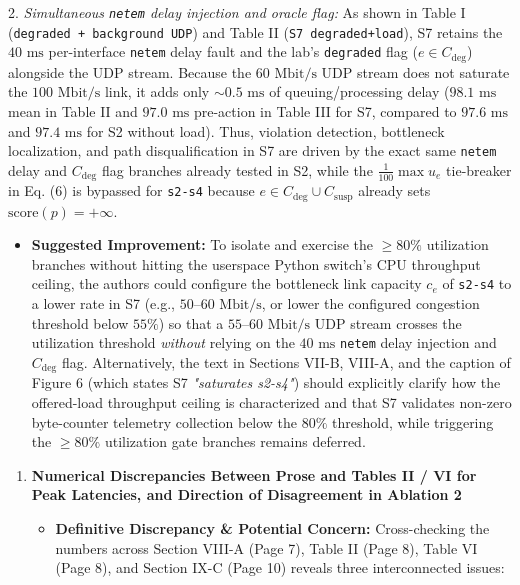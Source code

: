 \documentclass[11pt,a4paper]{article}
\begin{document}
2. \emph{Simultaneous \texttt{netem} delay injection and oracle flag:} As shown in Table I (\texttt{degraded + background UDP}) and Table II (\texttt{S7 degraded+load}), S7 retains the $40\text{ ms}$ per-interface \texttt{netem} delay fault and the lab's \texttt{degraded} flag ($e \in C_{\text{deg}}$) alongside the UDP stream. Because the $60\text{ Mbit/s}$ UDP stream does not saturate the $100\text{ Mbit/s}$ link, it adds only $\sim 0.5\text{ ms}$ of queuing/processing delay ($98.1\text{ ms}$ mean in Table II and $97.0\text{ ms}$ pre-action in Table III for S7, compared to $97.6\text{ ms}$ and $97.4\text{ ms}$ for S2 without load). Thus, violation detection, bottleneck localization, and path disqualification in S7 are driven by the exact same \texttt{netem} delay and $C_{\text{deg}}$ flag branches already tested in S2, while the $\frac{1}{100}\max u_e$ tie-breaker in Eq. (6) is bypassed for \texttt{s2-s4} because $e \in C_{\text{deg}} \cup C_{\text{susp}}$ already sets $\text{score}(p) = +\infty$.
\begin{itemize}[leftmargin=1.8em,itemsep=2pt]
\item \textbf{Suggested Improvement:} To isolate and exercise the $\ge 80\%$ utilization branches without hitting the userspace Python switch's CPU throughput ceiling, the authors could configure the bottleneck link capacity $c_e$ of \texttt{s2-s4} to a lower rate in S7 (e.g., $50\text{--}60\text{ Mbit/s}$, or lower the configured congestion threshold below $55\%$) so that a $55\text{--}60\text{ Mbit/s}$ UDP stream crosses the utilization threshold \emph{without} relying on the $40\text{ ms}$ \texttt{netem} delay injection and $C_{\text{deg}}$ flag. Alternatively, the text in Sections VII-B, VIII-A, and the caption of Figure 6 (which states S7 \emph{"saturates s2-s4"}) should explicitly clarify how the offered-load throughput ceiling is characterized and that S7 validates non-zero byte-counter telemetry collection below the $80\%$ threshold, while triggering the $\ge 80\%$ utilization gate branches remains deferred.
\end{itemize}
\begin{enumerate}[leftmargin=1.6em,itemsep=3pt]
\item \textbf{Numerical Discrepancies Between Prose and Tables II / VI for Peak Latencies, and Direction of Disagreement in Ablation 2}
\begin{itemize}[leftmargin=1.8em,itemsep=2pt]
\item \textbf{Definitive Discrepancy \& Potential Concern:} Cross-checking the numbers across Section VIII-A (Page 7), Table II (Page 8), Table VI (Page 8), and Section IX-C (Page 10) reveals three interconnected issues:
\end{itemize}
\end{enumerate}
\end{document}
